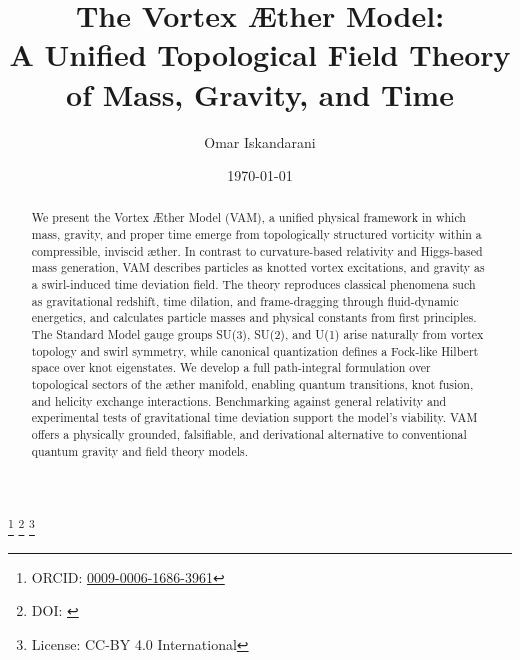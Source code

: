 \documentclass[12pt,aps,prd,onecolumn,nofootinbib,superscriptaddress]{revtex4-2}
\begin{document}
\title{The Vortex Æther Model: \\[1ex]
        \large A Unified Topological Field Theory of Mass, Gravity, and Time}

\author{Omar Iskandarani}
\thanks{ORCID: \href{https://orcid.org/0009-0006-1686-3961}{0009-0006-1686-3961}}
\thanks{DOI: \href{https://doi.org/\paperdoi}{\paperdoi}}
\thanks{License: CC-BY 4.0 International}
    
\date{\today}

\begin{abstract}
            We present the Vortex Æther Model (VAM), a unified physical framework in which mass, gravity, and proper time emerge from topologically structured vorticity within a compressible, inviscid æther. In contrast to curvature-based relativity and Higgs-based mass generation, VAM describes particles as knotted vortex excitations, and gravity as a swirl-induced time deviation field. The theory reproduces classical phenomena such as gravitational redshift, time dilation, and frame-dragging through fluid-dynamic energetics, and calculates particle masses and physical constants from first principles. The Standard Model gauge groups SU(3), SU(2), and U(1) arise naturally from vortex topology and swirl symmetry, while canonical quantization defines a Fock-like Hilbert space over knot eigenstates. We develop a full path-integral formulation over topological sectors of the æther manifold, enabling quantum transitions, knot fusion, and helicity exchange interactions. Benchmarking against general relativity and experimental tests of gravitational time deviation support the model’s viability. VAM offers a physically grounded, falsifiable, and derivational alternative to conventional quantum gravity and field theory models.
\end{abstract}
\maketitle
\end{document}
